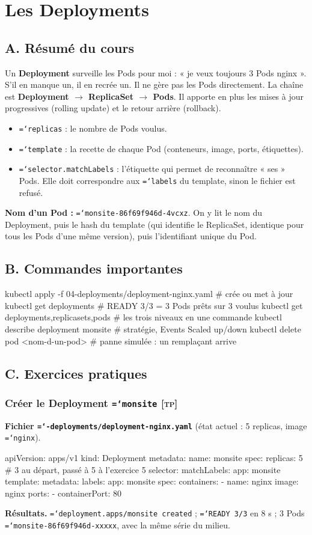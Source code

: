 \documentclass[11pt,a4paper]{article}
\newcommand{\cmd}[1]{\texttt{\hyphenchar\font=`\-#1}}
\newcommand{\tp}{\textsc{[tp]}}
\newcommand{\partie}[1]{\needspace{9\baselineskip}\subsection*{#1}}
\newcommand{\exo}[1]{\needspace{8\baselineskip}\subsubsection*{#1}}
\begin{document}
\section{Les Deployments}

\partie{A. Résumé du cours}
Un \textbf{Deployment} surveille les Pods pour moi : « je veux toujours 3 Pods nginx ». S'il en manque un, il en recrée un.
Il ne gère pas les Pods directement. La chaîne est \textbf{Deployment $\rightarrow$ ReplicaSet $\rightarrow$ Pods}.
Il apporte en plus les mises à jour progressives (rolling update) et le retour arrière (rollback).

\begin{itemize}
  \item \cmd{replicas} : le nombre de Pods voulus.
  \item \cmd{template} : la recette de chaque Pod (conteneurs, image, ports, étiquettes).
  \item \cmd{selector.matchLabels} : l'étiquette qui permet de reconnaître « ses » Pods. Elle doit correspondre aux \cmd{labels} du template, sinon le fichier est refusé.
\end{itemize}

\textbf{Nom d'un Pod :} \cmd{monsite-86f69f946d-4vcxz}. On y lit le nom du Deployment, puis le hash du template (qui identifie le ReplicaSet, identique pour tous les Pods d'une même version), puis l'identifiant unique du Pod.

\partie{B. Commandes importantes}
\begin{code}
kubectl apply -f 04-deployments/deployment-nginx.yaml   # crée ou met à jour
kubectl get deployments                  # READY 3/3 = 3 Pods prêts sur 3 voulus
kubectl get deployments,replicasets,pods # les trois niveaux en une commande
kubectl describe deployment monsite      # stratégie, Events Scaled up/down
kubectl delete pod <nom-d-un-pod>        # panne simulée : un remplaçant arrive
\end{code}

\partie{C. Exercices pratiques}
\exo{Créer le Deployment \cmd{monsite} \tp}
\textbf{Fichier \cmd{04-deployments/deployment-nginx.yaml}} (état actuel : 5 replicas, image \cmd{nginx}).
\begin{code}
apiVersion: apps/v1
kind: Deployment
metadata:
  name: monsite
spec:
  replicas: 5            # 3 au départ, passé à 5 à l'exercice 5
  selector:
    matchLabels:
      app: monsite
  template:
    metadata:
      labels:
        app: monsite
    spec:
      containers:
        - name: nginx
          image: nginx
          ports:
            - containerPort: 80
\end{code}
\textbf{Résultats.} \cmd{deployment.apps/monsite created} ; \cmd{READY 3/3} en 8 s ; 3 Pods \cmd{monsite-86f69f946d-xxxxx}, avec la même série du milieu.
\end{document}
